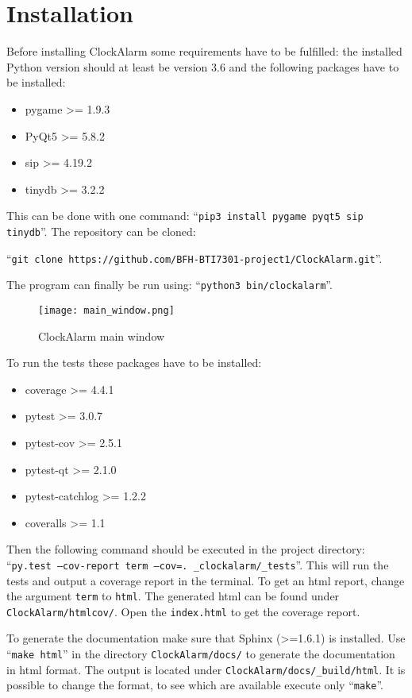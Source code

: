 \chapter{Installation}\label{ch:installation}

Before installing ClockAlarm some requirements have to be fulfilled: the
installed Python version should at least be version 3.6 and the following
packages have to be installed:

\begin{itemize}
    \item pygame >= 1.9.3
    \item PyQt5 >= 5.8.2 
    \item sip >= 4.19.2
    \item tinydb >= 3.2.2 
\end{itemize}

This can be done with one command: ``\texttt{pip3 install pygame pyqt5 sip
tinydb}''.
The repository can be cloned:

``\texttt{git clone https://github.com/BFH-BTI7301-project1/ClockAlarm.git}''.

The program can finally be run using: ``\texttt{python3 bin/clockalarm}''.

\begin{figure}[h]
    \centering
    \caption{ClockAlarm main window}
    \texttt{[image: main\_window.png]}
\end{figure}

To run the tests these packages have to be installed:

\begin{itemize}
    \item coverage >= 4.4.1
    \item pytest >= 3.0.7
    \item pytest-cov >= 2.5.1
    \item pytest-qt >= 2.1.0
    \item pytest-catchlog >= 1.2.2
    \item coveralls >= 1.1
\end{itemize}

Then the following command should be executed in the project directory:
``\texttt{py.test --cov-report term --cov=. \_clockalarm/\_tests}''. This will
run the tests and output a coverage report in the terminal. To get an html
report, change the argument \texttt{term} to \texttt{html}. The generated html
can be found under \texttt{ClockAlarm/htmlcov/}. Open the \texttt{index.html} to
get the coverage report.

To generate the documentation make sure that Sphinx (>=1.6.1) is installed. Use
``\texttt{make html}'' in the directory \texttt{ClockAlarm/docs/} to generate the
documentation in html format. The output is located under
\texttt{ClockAlarm/docs/\_build/html}. It is possible to change the format, to
see which are available execute only ``\texttt{make}''.
